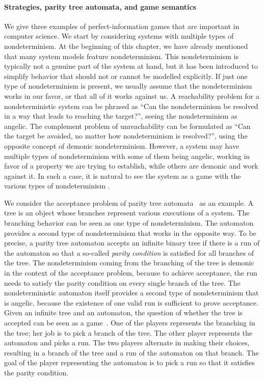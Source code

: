 \documentclass[../../diss.tex]{subfiles}
\begin{document}
\paragraph{Strategies, parity tree automata, and game semantics}

We give three examples of perfect-information games that are important in computer science.
We start by considering systems with multiple types of nondeterminism.
At the beginning of this chapter, we have already mentioned that many system models feature nondeterminism.
This nondeterminism is typically not a genuine part of the system at hand, but it has been introduced to simplify behavior that should not or cannot be modelled explicitly.
If just one type of nondeterminism is present, we usually assume that the nondeterminism works in our favor, or that all of it works against us.
A reachability problem for a nondeterministic system can be phrased as \enquote{Can the nondeterminism be resolved in a way that leads to reaching the target?}, seeing the nondeterminism as angelic.
The complement problem of unreachability can be formulated as \enquote{Can the target be avoided, no matter how nondeterminism is resolved?}, using the opposite concept of demonic nondeterminism.
However, a system may have multiple types of nondeterminism with some of them being angelic, \ie working in favor of a property we are trying to establish, while others are demonic and work against it.
In such a case, it is natural to see the system as a game with the various types of nondeterminism .

We consider the acceptance problem of parity tree automata~\cite{Zielonka98} as an example.
A tree is an object whose branches represent various executions of a system.
The branching behavior can be seen as one type of nondeterminism.
The automaton provides a second type of nondeterminism that works in the opposite way.
To be precise, a parity tree automaton accepts an infinite binary tree if there is a run of the automaton so that a so-called \emph{parity condition} is satisfied for all branches of the tree.
The nondeterminism coming from the branching of the tree is demonic in the context of the acceptance problem, because to achieve acceptance, the run needs to satisfy the parity condition on every single branch of the tree.
The nondeterministic automaton itself provides a second type of nondeterminism that is angelic, because the existence of one valid run is sufficient to prove acceptance.
Given an infinite tree and an automaton, the question of whether the tree is accepted can be seen as a game~\cite{Zielonka98}.
One of the players represents the branching in the tree; her job is to pick a branch of the tree.
The other player represents the automaton and picks a run.
The two players alternate in making their choices, resulting in a branch of the tree and a run of the automaton on that branch.
The goal of the player representing the automaton is to pick a run so that it satisfies the parity condition.
\end{document}
